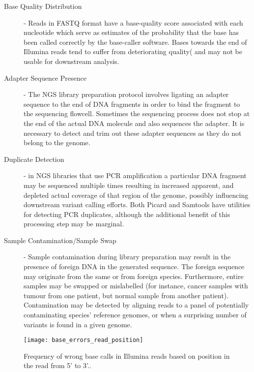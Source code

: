 \begin{description}
    \item [Base Quality Distribution] - Reads in FASTQ format have a base-quality score associated with each nucleotide which serve as estimates of the probability that the base has been called correctly by the base-caller software. Bases towards the end of Illumina reads tend to suffer from deteriorating quality(\autocite{dohm2008substantial} and may not be usable for downstream analysis. 
    \item [Adapter Sequence Presence] - The NGS library preparation protocol involves ligating an adapter sequence to the end of DNA fragments in order to bind the fragment to the sequencing flowcell. Sometimes the sequencing process does not stop at the end of the actual DNA molecule and also sequences the adapter. It is necessary to detect and trim out these adapter sequences as they do not belong to the genome\autocite{bolger2014trimmomatic}.
    \item [Duplicate Detection] - in NGS libraries that use PCR amplification a particular DNA fragment may be sequenced multiple times resulting in increased apparent, and depleted actual coverage of that region of the genome, possibly influencing downstream variant calling efforts. Both Picard\autocite{Picard2018toolkit} and Samtools\autocite{li2011statistical} have utilities for detecting PCR duplicates, although the additional benefit of this processing step may be marginal\autocite{ebbert2016evaluating}.
    \item [Sample Contamination/Sample Swap] - Sample contamination during library preparation may result in the presence of foreign DNA in the generated sequence. The foreign sequence may originate from the same or from foreign species. Furthermore, entire samples may be swapped or mislabelled (for instance, cancer samples with tumour from one patient, but normal sample from another patient). Contamination may be detected by aligning reads to a panel of potentially contaminating species' reference genomes\autocite{zhou2013qc}, or when a surprising number of variants is found in a given genome.
\end{description}

\begin{figure}[H]
    \texttt{[image: base\_errors\_read\_position]}
    \centering
    \caption {Frequency of wrong base calls in Illumina reads based on position in the read from 5' to 3'.\autocite{dohm2008substantial}.}
    \label{fig:base_errors_read_position}
\end{figure}

